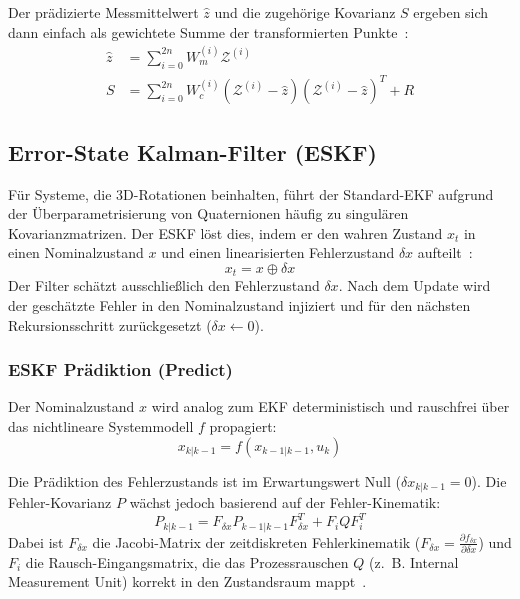 Der prädizierte Messmittelwert $\hat{z}$ und die zugehörige Kovarianz $S$ ergeben sich dann einfach als gewichtete Summe der transformierten Punkte~\cite{julier1997new}:
\begin{align}
    \hat{z} &= \sum_{i=0}^{2n} W_m^{(i)} \mathcal{Z}^{(i)} \\
    S &= \sum_{i=0}^{2n} W_c^{(i)} (\mathcal{Z}^{(i)} - \hat{z})(\mathcal{Z}^{(i)} - \hat{z})^T + R
\end{align}

\subsection{Error-State Kalman-Filter (ESKF)}
\label{subsec:ESKF}
Für Systeme, die 3D-Rotationen beinhalten, führt der Standard-\ac{EKF} aufgrund der Überparametrisierung von Quaternionen häufig zu singulären Kovarianzmatrizen. Der \ac{ESKF} löst dies, indem er den wahren Zustand $x_t$ in einen Nominalzustand $x$ und einen linearisierten Fehlerzustand $\delta x$ aufteilt~\cite{sola2017quaternion, forster2017manifold}:
\begin{equation}
    x_t = x \oplus \delta x
\end{equation}
Der Filter schätzt ausschließlich den Fehlerzustand $\delta x$. Nach dem Update wird der geschätzte Fehler in den Nominalzustand injiziert und für den nächsten Rekursionsschritt zurückgesetzt ($\delta x \leftarrow 0$).

\subsubsection{ESKF Prädiktion (Predict)}
Der Nominalzustand $x$ wird analog zum \ac{EKF} deterministisch und rauschfrei über das nichtlineare Systemmodell $f$ propagiert:
\begin{equation}
    x_{k|k-1} = f(x_{k-1|k-1}, u_k)
\end{equation}

Die Prädiktion des Fehlerzustands ist im Erwartungswert Null ($\delta x_{k|k-1} = 0$). Die Fehler-Kovarianz $P$ wächst jedoch basierend auf der Fehler-Kinematik:
\begin{equation}
    P_{k|k-1} = F_{\delta x} P_{k-1|k-1} F_{\delta x}^T + F_i Q F_i^T
\end{equation}
Dabei ist $F_{\delta x}$ die Jacobi-Matrix der zeitdiskreten Fehlerkinematik ($F_{\delta x} = \frac{\partial f_{\delta x}}{\partial \delta x}$) und $F_i$ die Rausch-Eingangsmatrix, die das Prozessrauschen $Q$ (z.~B. Internal Measurement Unit) korrekt in den Zustandsraum mappt~\cite{forster2017manifold}.

